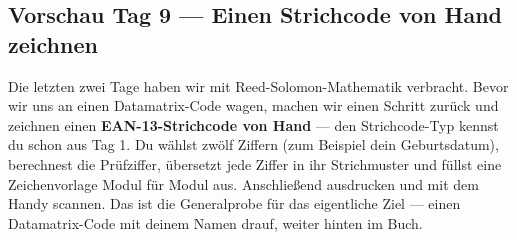 \subsection*{Vorschau Tag 9 — Einen Strichcode von Hand zeichnen}

Die letzten zwei Tage haben wir mit Reed-Solomon-Mathematik
verbracht. Bevor wir uns an einen Datamatrix-Code wagen, machen wir
einen Schritt zurück und zeichnen einen \textbf{EAN-13-Strichcode von
Hand} — den Strichcode-Typ kennst du schon aus Tag 1. Du wählst zwölf
Ziffern (zum Beispiel dein Geburtsdatum), berechnest die Prüfziffer,
übersetzt jede Ziffer in ihr Strichmuster und füllst eine
Zeichenvorlage Modul für Modul aus. Anschließend ausdrucken und mit
dem Handy scannen. Das ist die Generalprobe für das eigentliche Ziel
— einen Datamatrix-Code mit deinem Namen drauf, weiter hinten im Buch.
